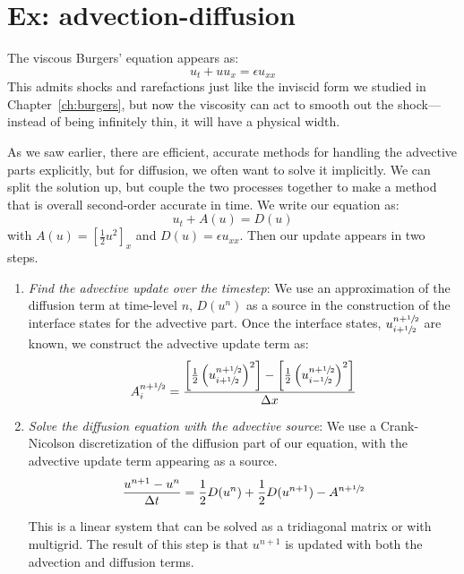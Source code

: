 \section{Ex: advection-diffusion}

\label{ch:multiphysics:sec:adburgers}

The viscous Burgers' equation appears as:
\begin{equation}
u_t + u u_x = \epsilon u_{xx}
\end{equation}
This admits shocks and rarefactions just like the inviscid form we
studied in Chapter~\ref{ch:burgers}, but now the viscosity can act to
smooth out the shock---instead of being infinitely thin, it will have
a physical width.

As we saw earlier, there are efficient, accurate methods for handling
the advective parts explicitly, but for diffusion, we often want to 
solve it implicitly.  We can split the solution up, but couple the 
two processes together to make a method that is overall second-order
accurate in time.  We write our equation as:
\begin{equation}
u_t + A(u) = D(u)
\end{equation}
with $A(u) = [\frac{1}{2} u^2]_x$ and $D(u) = \epsilon u_{xx}$.  Then our update 
appears in two steps.
\begin{enumerate}
\item {\em Find the advective update over the timestep}:
   We use an approximation of the diffusion term at time-level $n$, $D(u^n)$
   as a source in the construction of the interface states for the 
   advective part.  Once the interface states, $u_{i+{\sfrac{1}{2}}}^{n+{\sfrac{1}{2}}}$ are
   known, we construct the advective update term as:
   \begin{equation}
   A_i^{n+{\sfrac{1}{2}}} = 
     \frac{\left [ \frac{1}{2} \left (u_{i+{\sfrac{1}{2}}}^{n+{\sfrac{1}{2}}}\right)^2\right ] -
           \left [ \frac{1}{2} \left (u_{i-{\sfrac{1}{2}}}^{n+{\sfrac{1}{2}}}\right)^2\right ]}
          {\Delta x}
    \end{equation}

\item {\em Solve the diffusion equation with the advective source}:
    We use a Crank-Nicolson discretization of the diffusion part of 
    our equation, with the advective update term appearing as a source.
    \begin{equation}
    \frac{u^{n+1} - u^n}{\Delta t} = 
        \frac{1}{2}D(u^n) + \frac{1}{2}D(u^{n+1}) - A^{n+{\sfrac{1}{2}}}
    \end{equation}
    
    This is a linear system that can be solved as a tridiagonal matrix
    or with multigrid.  The result of this step is that $u^{n+1}$ is
    updated with both the advection and diffusion terms.

\end{enumerate}

